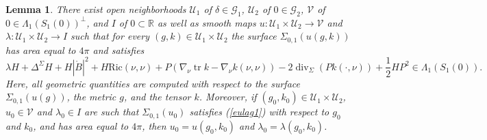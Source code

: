 \documentclass[10pt,a4paper]{amsart}
\newtheorem{lemma}{Lemma}
\newcommand{\diver}{\operatorname{div}}
\newcommand{\tr}{\operatorname{tr}}
\begin{document}
\begin{lemma}
There exist open neighborhoods $\mathcal{U}_1$ of $\delta \in  \mathcal{G}_1$, $\mathcal{U}_2$ of $0 \in  \mathcal{G}_2$,  $\mathcal{V}$ of $0 \in \Lambda_1(S_1(0))^\bot$, and $I$ of $0 \subset \mathbb{R}$ as
well as smooth maps $u : \mathcal{U}_1 \times \mathcal{U}_2 \longrightarrow \mathcal{V}$ and $\lambda : \mathcal{U}_1 \times \mathcal{U}_2 \longrightarrow I$ such that for every $(g,k)\in\mathcal U_1\times\mathcal U_2$ the surface $\Sigma_{0,1}(u(g,k))$ has area equal to $4 \pi$ and satisfies
\begin{equation}\label{eulag1}
 \lambda H  +\Delta^\Sigma H + H|\mathring{B}|^2+ H \mathrm{Ric}(\nu, \nu)+P( \nabla_\nu \tr k - \nabla_\nu k(\nu,\nu )) - 2\diver_\Sigma (Pk(\cdot, \nu)) +\frac{1}{2}H P^2 \in \Lambda_1(S_1(0)).
\end{equation}  
Here, all geometric quantities are computed with respect to the surface $\Sigma_{0,1}(u(g))$, the metric $g$, and the tensor $k$. Moreover, if $(g_0,k_0) \in \mathcal{U}_1 \times \mathcal{U}_2 $,  $u_0 \in \mathcal{V} $ and $\lambda_0 \in I$ are such that $\Sigma_{0,1}(u_0)$ satisfies (\ref{eulag1}) with respect to $g_0$ and $k_0$, and has area equal to $4 \pi$, then $u_0 = u(g_0, k_0)$ and $\lambda_0 = \lambda (g_0, k_0)$.
\end{lemma}
\end{document}
